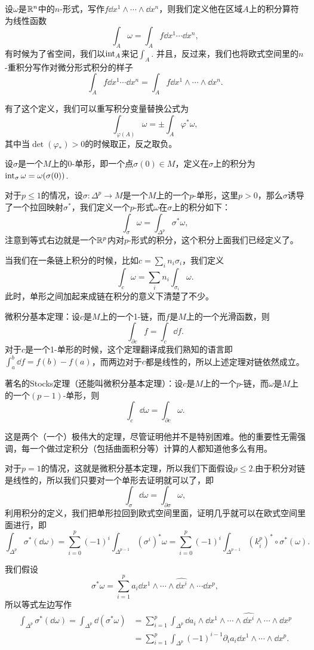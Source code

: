 \para 设$\omega$是$\mathbb{R}^n$中的$n$-形式，写作$f\dd x^1\wedge\cdots\wedge \dd x^n$，则我们定义他在区域$A$上的积分算符为线性函数
\[
	\int_A \omega=\int_A f \dd x^1\cdots\dd x^n,
\]
有时候为了省空间，我们以$\operatorname{int}_A$来记$\int_A$. 并且，反过来，我们也将欧式空间里的$n$-重积分写作对微分形式积分的样子
\[
	\int_A f \dd x^1\cdots\dd x^n=\int_A f\dd x^1\wedge\cdots\wedge \dd x^n.
\]

有了这个定义，我们可以重写积分变量替换公式为
\[
	\int_{\varphi(A)}\omega=\pm\int_A \varphi^*\omega,
\]
其中当$\det(\varphi_*)>0$的时候取正，反之取负。

\para 设$\sigma$是一个$M$上的0-单形，即一个点$\sigma(0)\in M$，定义在$\sigma$上的积分为$\operatorname{int}_\sigma \omega=\omega(\sigma(0))$.

\para 对于$p\leq 1$的情况，设$\sigma:\Delta^p\to M$是一个$M$上的一个$p$-单形，这里$p>0$，那么$\sigma$诱导了一个拉回映射$\sigma^*$，我们定义一个$p$-形式$\omega$在$\sigma$上的积分如下：
\[
	\int_\sigma \omega=\int_{\Delta^p} \sigma^*\omega,
\]
注意到等式右边就是一个$\mathbb{R}^{p}$内对$p$-形式的积分，这个积分上面我们已经定义了。

当我们在一条链上积分的时候，比如$c=\sum_{i} n_i \sigma_i$，我们定义
\[
	\int_c \omega=\sum_i n_i \int_{\sigma_i} \omega.
\]
此时，单形之间加起来成链在积分的意义下清楚了不少。

\theo 微积分基本定理：设$c$是$M$上的一个1-链，而$f$是$M$上的一个光滑函数，则
\[
	\int_{\partial c} f=\int_c \dd f.
\]
对于$c$是一个1-单形的时候，这个定理翻译成我们熟知的语言即$\int_a^b \dd f=f(b)-f(a)$，而两边对于$c$都是线性的，所以上述定理对链依然成立。

\theo 著名的Stocks定理（还能叫微积分基本定理）：设$c$是$M$上的一个$p$-链，而$\omega$是$M$上的一个$(p-1)$-单形，则
\[
	\int_c \dd \omega=\int_{\partial c} \omega.
\]

这是两个（一个）极伟大的定理，尽管证明他并不是特别困难。他的重要性无需强调，每一个做过定积分（包括曲面积分等）计算的人都知道他多么有用。

\proof 对于$p=1$的情况，这就是微积分基本定理，所以我们下面假设$p\leq 2$.由于积分对链是线性的，所以我们只要对一个单形去证明就可以了，即
\[
	\int_{\sigma} \dd \omega=\int_{\partial \sigma} \omega,
\]
利用积分的定义，我们把单形拉回到欧式空间里面，证明几乎就可以在欧式空间里面进行，即
\[
	\int_{\Delta^p} \sigma^*(\dd \omega)=\sum_{i=0}^p(-1)^i\int_{\Delta^{p-1}} (\sigma^i)^*\omega=\sum_{i=0}^p(-1)^i\int_{\Delta^{p-1}} (k^p_i)^*\circ \sigma^*(\omega).
\]

我们假设
\[
	\sigma^*\omega=\sum_{i=1}^pa_i\dd x^1\wedge\cdots\wedge\widehat{\dd x^i}\wedge\cdots \dd x^p,
\]
所以等式左边写作
\[
\begin{split}
	\int_{\Delta^p} \sigma^*(\dd \omega)=\int_{\Delta^p} \dd(\sigma^* \omega)&=\sum_{i=1}^p\int_{\Delta^{p}} \dd a_i\wedge \dd x^1\wedge\cdots\wedge\widehat{\dd x^i}\wedge\cdots\wedge\dd x^p\\
	&=\sum_{i=1}^p\int_{\Delta^{p}} (-1)^{i-1}\partial_i a_i\dd x^1\wedge\cdots \wedge\dd x^p.
\end{split}
\]

